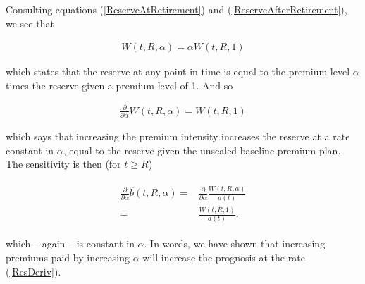 \documentclass{article}
\newcommand{\1}[1]{\mathbbm{1}_{\left\lbrace #1 \right\rbrace}}
\theoremstyle{break}
\theoremstyle{remark}
\numberwithin{equation}{section}
\begin{document}
Consulting equations (\ref{ReserveAtRetirement}) and (\ref{ReserveAfterRetirement}), we see that

\begin{align*}
	W(t,R,\alpha) = \alpha W(t,R,1)
\end{align*}

which states that the reserve at any point in time is equal to the premium level $\alpha$ times the reserve given a premium level of 1. And so

\begin{align} \label{AlphaDeriv}
	\frac{\partial}{\partial \alpha }W(t,R,\alpha) = W(t,R,1)
\end{align}

which says that increasing the premium intensity increases the reserve at a rate constant in $\alpha$, equal to the reserve given the unscaled baseline premium plan. The sensitivity is then (for $t \geq R$)

\begin{align} \label{ResDeriv}
\begin{split}
		\frac{\partial}{\partial \alpha} \hat{b}(t,R,\alpha) =& \frac{\partial}{\partial \alpha }\frac{W(t,R,\alpha)}{a(t)}\\
	=& \frac{W(t,R,1)}{a(t)},
\end{split}
\end{align}

which -- again -- is constant in $\alpha$. In words, we have shown that increasing premiums paid by increasing $\alpha$ will increase the prognosis at the rate (\ref{ResDeriv}).
\end{document}
